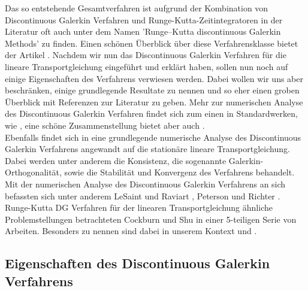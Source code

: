 Das so entstehende Gesamtverfahren ist aufgrund der Kombination von Discontinuous Galerkin Verfahren und Runge-Kutta-Zeitintegratoren in der Literatur oft auch unter dem Namen 'Runge–Kutta discontinuous Galerkin Methods' zu finden. Einen schönen Überblick über diese Verfahrensklasse bietet der Artikel \cite{cockburn2001runge}.
Nachdem wir nun das Discontinuous Galerkin Verfahren für die lineare Transportgleichung eingeführt und erklärt haben, sollen nun noch auf einige Eigenschaften des Verfahrens verwiesen werden. Dabei wollen wir uns aber beschränken, einige grundlegende Resultate zu nennen und so eher einen groben Überblick mit Referenzen zur Literatur zu geben. Mehr zur numerischen Analyse des Discontinuous Galerkin Verfahren findet sich zum einen in Standardwerken, wie \cite{ern2004theory}, eine schöne Zusammenstellung bietet aber auch
\cite{Har08b}. \\
Ebenfalls findet sich in \cite{Har08b} eine grundlegende numerische Analyse des Discontinuous Galerkin Verfahrens angewandt auf die stationäre lineare Transportgleichung. Dabei werden unter anderem die Konsistenz, die sogenannte Galerkin-Orthogonalität, sowie die Stabilität und Konvergenz des Verfahrens behandelt.
Mit der numerischen Analyse des Discontinuous Galerkin Verfahrens an sich befassten sich unter anderem LeSaint und Raviart \cite{lesaint1974finite}, Peterson \cite{peterson1991note} und Richter \cite{richter1988optimal}.
Runge-Kutta DG Verfahren für der linearen Transportgleichung ähnliche Problemstellungen betrachteten Cockburn und Shu in einer 5-teiligen Serie von Arbeiten. Besonders zu nennen sind dabei in unserem Kontext \cite{cockburn1989tvb} und \cite{cockburn1990runge}.


\subsection{Eigenschaften des Discontinuous Galerkin Verfahrens}
